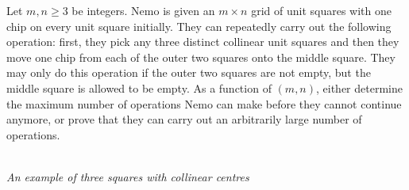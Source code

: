 Let $m,n \ge 3$ be integers.
Nemo is given an $m \times n$ grid of unit squares with one chip on every unit square initially.
They can repeatedly carry out the following operation:
first, they pick any three distinct collinear unit squares and
then they move one chip from each of the outer two squares onto the middle square.
They may only do this operation if the outer two squares are not empty,
but the middle square is allowed to be empty. 
As a function of $(m,n)$, either determine the maximum number of operations Nemo can make
before they cannot continue anymore, or prove that they can carry out an arbitrarily large number of operations.

\begin{center}
\\
\emph{An example of three squares with collinear centres}
\end{center}
